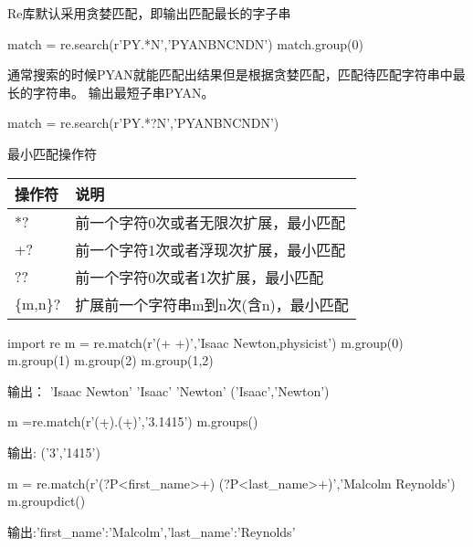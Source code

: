 Re库默认采用贪婪匹配，即输出匹配最长的字子串
\begin{python}
match = re.search(r'PY.*N','PYANBNCNDN')
match.group(0)
\end{python}
通常搜索的时候PYAN就能匹配出结果但是根据贪婪匹配，匹配待匹配字符串中最长的字符串。
输出最短子串PYAN。
\begin{python}
match = re.search(r'PY.*?N','PYANBNCNDN')
\end{python}
最小匹配操作符\newline
\begin{tabular}{|l|l|}
\hline
操作符&说明\\
\hline
*?&前一个字符0次或者无限次扩展，最小匹配\\
\hline
+?&前一个字符1次或者浮现次扩展，最小匹配\\
\hline
??&前一个字符0次或者1次扩展，最小匹配\\
\hline
\{m,n\}?&扩展前一个字符串m到n次(含n)，最小匹配\\
\hline
\end{tabular}
\begin{python}
import re
m = re.match(r'(\w+ \w+)','Isaac Newton,physicist')
m.group(0)
m.group(1)
m.group(2)
m.group(1,2)
\end{python}
输出：\newline
'Isaac Newton'\newline
'Isaac' \newline
'Newton'\newline
('Isaac','Newton')\newline
\begin{python}
m =re.match(r'(\d+).(\d+)','3.1415')
m.groups()
\end{python}
输出:\newline
('3','1415')\newline
\begin{python}
m = re.match(r'(?P<first_name>\w+) (?P<last_name>\w+)','Malcolm Reynolds')
m.groupdict()
\end{python}
输出:{'first\_name':'Malcolm','last\_name':'Reynolds'}\newline

